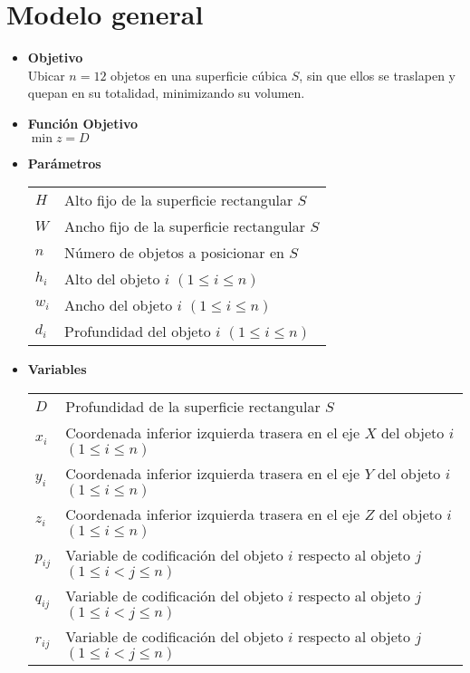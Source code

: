\section{Modelo general\label{sec:modelo_general}}

\begin{itemize}
\item {\bf Objetivo} \\[6pt]
Ubicar $n=12$ objetos en una superficie cúbica $S$, sin que
ellos se traslapen y quepan en su totalidad, minimizando su
volumen.
\item {\bf Función Objetivo} \\[6pt]
$\min z = D$
\item {\bf Parámetros} \\[6pt]
\begin{tabular}{p{0.5cm} l}
$H$      & Alto fijo de la superficie rectangular $S$ \\
$W$      & Ancho fijo de la superficie rectangular $S$ \\
$n$      & Número de objetos a posicionar en $S$ \\
$h_i$    & Alto del objeto $i$ $(1 \le i \le n)$ \\
$w_i$    & Ancho del objeto $i$ $(1 \le i \le n)$ \\
$d_i$    & Profundidad del objeto $i$ $(1 \le i \le n)$ \\
\end{tabular}
\item {\bf Variables} \\[6pt]
\begin{tabular}{p{0.5cm} l}
$D$      & Profundidad de la superficie rectangular $S$ \\
$x_i$    & Coordenada inferior izquierda trasera en el eje $X$ del objeto $i$ $(1 \le i \le n)$ \\
$y_i$    & Coordenada inferior izquierda trasera en el eje $Y$ del objeto $i$ $(1 \le i \le n)$ \\
$z_i$    & Coordenada inferior izquierda trasera en el eje $Z$ del objeto $i$ $(1 \le i \le n)$ \\
$p_{ij}$ & Variable de codificación del objeto $i$ respecto al objeto $j$ $(1 \le i < j \le n)$ \\
$q_{ij}$ & Variable de codificación del objeto $i$ respecto al objeto $j$ $(1 \le i < j \le n)$ \\
$r_{ij}$ & Variable de codificación del objeto $i$ respecto al objeto $j$ $(1 \le i < j \le n)$ \\
\end{tabular} \\

\end{itemize}
